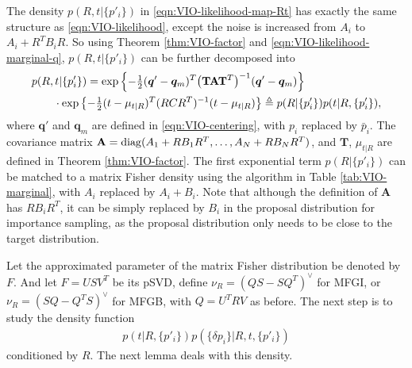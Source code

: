 The density $p(R,t|\{p'_i\})$ in \eqref{eqn:VIO-likelihood-map-Rt} has exactly the same structure as \eqref{eqn:VIO-likelihood}, except the noise is increased from $A_i$ to $A_i+R^TB_iR$.
So using Theorem \ref{thm:VIO-factor} and \eqref{eqn:VIO-likelihood-marginal-q}, $p(R,t|\{p'_i\})$ can be further decomposed into
\begin{align} \label{eqn:VIO-likelihood-map-Rt-factor}
	&p(R,t|\{p'_i\}) = \exp\left\{ -\tfrac{1}{2} (\bm{q}'-\bm{q}_m)^T \big(\mathbf{T}\mathbf{A}\mathbf{T}^T\big)^{-1} (\bm{q}'-\bm{q}_m) \right\} \nonumber \\
	&\qquad \cdot \exp\left\{ -\tfrac{1}{2} (t - \mu_{t|R})^T (RCR^T)^{-1} (t - \mu_{t|R}) \right\} \triangleq p(R|\{p'_i\}) p(t|R,\{p'_i\}),
\end{align}
where $\bm{q}'$ and $\bm{q}_m$ are defined in \eqref{eqn:VIO-centering}, with $p_i$ replaced by $\bar{p}_i$.
The covariance matrix $\mathbf{A} = \mathrm{diag}(A_1+RB_1R^T, \ldots, A_N+RB_NR^T)$, and $\mathbf{T}$, $\mu_{t|R}$ are defined in Theorem \ref{thm:VIO-factor}.
The first exponential term $p(R|\{p'_i\})$ can be matched to a matrix Fisher density using the algorithm in Table \ref{tab:VIO-marginal}, with $A_i$ replaced by $A_i+B_i$.
Note that although the definition of $\mathbf{A}$ has $RB_iR^T$, it can be simply replaced by $B_i$ in the proposal distribution for importance sampling, as the proposal distribution only needs to be close to the target distribution.

Let the approximated parameter of the matrix Fisher distribution be denoted by $F$.
And let $F = USV^T$ be its pSVD, define $\nu_R = (QS-SQ^T)^\vee$ for MFGI, or $\nu_R = (SQ-Q^TS)^\vee$ for MFGB, with $Q = U^TRV$ as before.
The next step is to study the density function
\begin{align*}
	p(t|R,\{p'_i\}) p(\{\delta p_i\}|R,t,\{p'_i\})
\end{align*}
conditioned by $R$.
The next lemma deals with this density.

